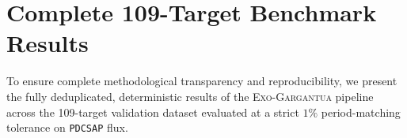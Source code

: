 \documentclass[twocolumn,linenumbers]{aastex701}
\begin{document}
\appendix
\section{Complete 109-Target Benchmark Results}
\label{sec:appendix_table}

To ensure complete methodological transparency and reproducibility, we present the fully deduplicated, deterministic results of the \textsc{Exo-Gargantua} pipeline across the 109-target validation dataset evaluated at a strict $1\%$ period-matching tolerance on \texttt{PDCSAP} flux. 


{}

\end{document}

